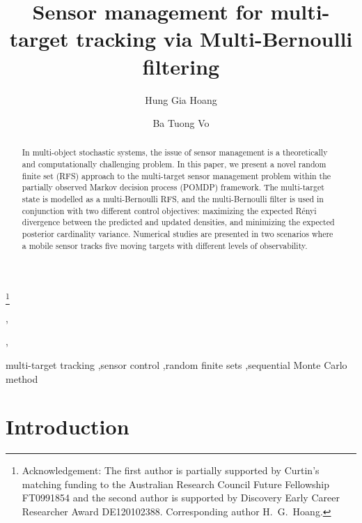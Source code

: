 \documentclass[twocolumn]{autart}
\begin{document}
\begin{frontmatter}


\title{Sensor management for multi-target tracking via Multi-Bernoulli filtering} 

\thanks[footnoteinfo]{Acknowledgement: The first author is partially supported by Curtin's matching funding to the Australian Research Council Future Fellowship FT0991854 and the second author is supported by Discovery Early Career Researcher Award DE120102388. Corresponding author H.~G.~Hoang.}

\author[a]{Hung Gia Hoang},    \author[a]{Ba Tuong Vo},               

\address[a]{Department of Electrical and Computer Engineering, Curtin University, Perth WA 6845, Australia}  


\begin{keyword}                           multi-target tracking \sep sensor control \sep random finite sets \sep sequential Monte Carlo method               \end{keyword}                             


\begin{abstract}                          In multi-object stochastic systems, the issue of sensor management is a theoretically
and computationally challenging problem. In this paper, we present a novel random
finite set (RFS) approach to the multi-target sensor management problem
within the partially observed Markov decision process (POMDP) framework. The
multi-target state is modelled as a multi-Bernoulli RFS, and the multi-Bernoulli filter
is used in conjunction with two different control objectives: maximizing the
expected R\'enyi divergence between the predicted and updated densities, and minimizing
the expected posterior cardinality variance. Numerical studies are presented in two
scenarios where a mobile sensor tracks five moving targets with different levels of
observability.
\end{abstract}

\end{frontmatter}

\section{Introduction}
\end{document}
